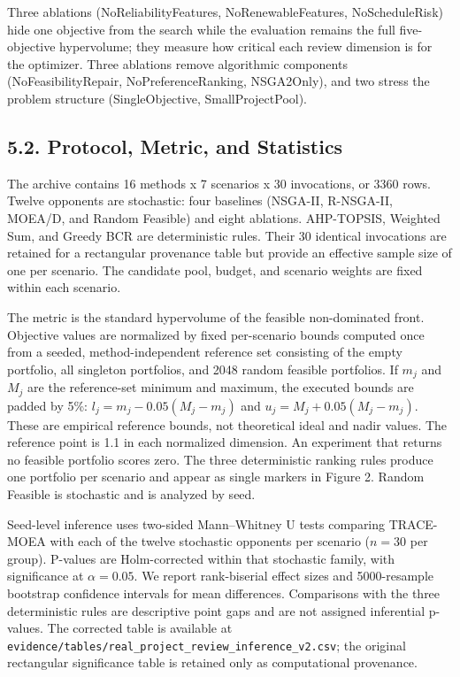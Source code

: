 \documentclass[
  10pt,
  a4paper,
]{article}
\begin{document}
Three ablations (NoReliabilityFeatures, NoRenewableFeatures,
NoScheduleRisk) hide one objective from the search while the evaluation
remains the full five-objective hypervolume; they measure how critical
each review dimension is for the optimizer. Three ablations remove
algorithmic components (NoFeasibilityRepair, NoPreferenceRanking,
NSGA2Only), and two stress the problem structure (SingleObjective,
SmallProjectPool).

\subsection{5.2. Protocol, Metric, and
Statistics}\label{protocol-metric-and-statistics}

The archive contains 16 methods x 7 scenarios x 30 invocations, or 3360
rows. Twelve opponents are stochastic: four baselines (NSGA-II,
R-NSGA-II, MOEA/D, and Random Feasible) and eight ablations. AHP-TOPSIS,
Weighted Sum, and Greedy BCR are deterministic rules. Their 30 identical
invocations are retained for a rectangular provenance table but provide
an effective sample size of one per scenario. The candidate pool,
budget, and scenario weights are fixed within each scenario.

The metric is the standard hypervolume of the feasible non-dominated
front. Objective values are normalized by fixed per-scenario bounds
computed once from a seeded, method-independent reference set consisting
of the empty portfolio, all singleton portfolios, and 2048 random
feasible portfolios. If \(m_j\) and \(M_j\) are the reference-set
minimum and maximum, the executed bounds are padded by 5\%:
\(l_j=m_j-0.05(M_j-m_j)\) and \(u_j=M_j+0.05(M_j-m_j)\). These are
empirical reference bounds, not theoretical ideal and nadir values. The
reference point is 1.1 in each normalized dimension. An experiment that
returns no feasible portfolio scores zero. The three deterministic
ranking rules produce one portfolio per scenario and appear as single
markers in Figure 2. Random Feasible is stochastic and is analyzed by
seed.

Seed-level inference uses two-sided Mann--Whitney U tests comparing
TRACE-MOEA with each of the twelve stochastic opponents per scenario
(\(n=30\) per group). P-values are Holm-corrected within that stochastic
family, with significance at \(\alpha=0.05\). We report rank-biserial
effect sizes and 5000-resample bootstrap confidence intervals for mean
differences. Comparisons with the three deterministic rules are
descriptive point gaps and are not assigned inferential p-values. The
corrected table is available at
\texttt{evidence/tables/real\_project\_review\_inference\_v2.csv}; the
original rectangular significance table is retained only as
computational provenance.
\end{document}
